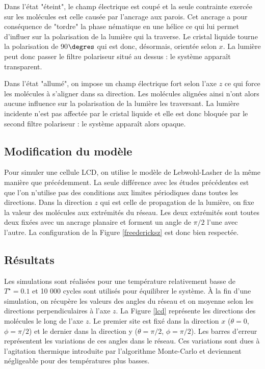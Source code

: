 \documentclass[11pt,a4paper]{article}
\numberwithin{equation}{section}
\begin{document}
Dans l'état "éteint", le champ électrique est coupé et la seule contrainte exercée sur les molécules est celle causée par l'ancrage aux parois. Cet ancrage a pour conséquence de "tordre" la phase nématique en une hélice ce qui lui permet d'influer sur la polarisation de la lumière qui la traverse. Le cristal liquide tourne la polarisation de 90$\degres$ qui est donc, désormais, orientée selon $x$. La lumière peut donc passer le filtre polariseur situé au dessus : le système apparaît transparent.
\medskip

Dans l'état "allumé", on impose un champ électrique fort selon l'axe $z$ ce qui force les molécules à s'aligner dans sa direction. Les molécules alignées ainsi n'ont alors aucune influence sur la polarisation de la lumière les traversant. La lumière incidente n'est pas affectée par le cristal liquide et elle est donc bloquée par le second filtre polariseur : le système apparaît alors opaque.
\medskip

\subsection{Modification du modèle}

Pour simuler une cellule LCD, on utilise le modèle de Lebwohl-Lasher de la même manière que précédemment. La seule différence avec les études précédentes est que l'on n'utilise pas des conditions aux limites périodiques dans toutes les directions. Dans la direction $z$ qui est celle de propagation de la lumière, on fixe la valeur des molécules aux extrémités du réseau. Les deux extrémités sont toutes deux fixées avec un ancrage planaire et forment un angle de $\pi/2$ l'une avec l'autre. La configuration de la Figure \ref{freedericksz} est donc bien respectée.

\subsection{Résultats}

Les simulations sont réalisées pour une température relativement basse de $T^\star =0.1$ et 10 000 cycles sont utilisés pour équilibrer le système. À la fin d'une simulation, on récupère les valeurs des angles du réseau et on moyenne selon les directions perpendiculaires à l'axe $z$. La Figure \ref{lcd} représente les directions des molécules le long de l'axe $z$. Le premier site est fixé dans la direction $x$ ($\theta = 0$, $\phi=\pi/2$) et le dernier dans la direction y ($\theta = \pi/2$, $\phi=\pi/2$). Les barres d'erreur représentent les variations de ces angles dans le réseau. Ces variations sont dues à l'agitation thermique introduite par l'algorithme Monte-Carlo et deviennent négligeable pour des températures plus basses.
\end{document}
